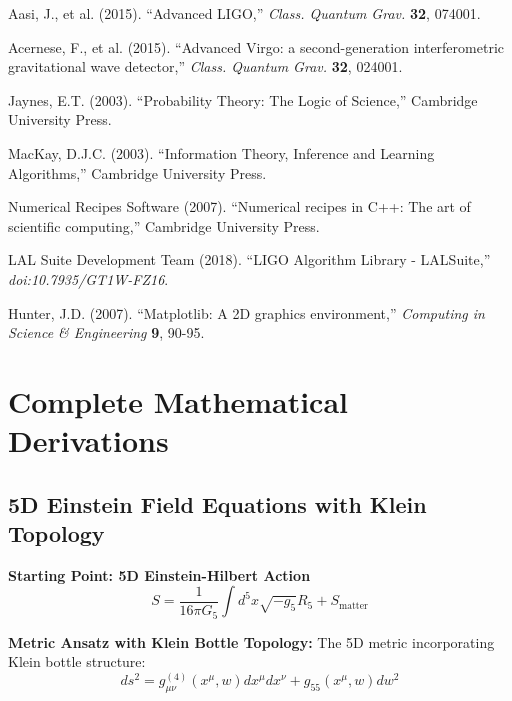 \documentclass[12pt,a4paper]{article}
\begin{document}
\begin{thebibliography}{200}
Aasi, J., et al. (2015). ``Advanced LIGO,'' \textit{Class. Quantum Grav.} \textbf{32}, 074001.

Acernese, F., et al. (2015). ``Advanced Virgo: a second-generation interferometric gravitational wave detector,'' \textit{Class. Quantum Grav.} \textbf{32}, 024001.

Jaynes, E.T. (2003). ``Probability Theory: The Logic of Science,'' Cambridge University Press.

MacKay, D.J.C. (2003). ``Information Theory, Inference and Learning Algorithms,'' Cambridge University Press.

Numerical Recipes Software (2007). ``Numerical recipes in C++: The art of scientific computing,'' Cambridge University Press.

LAL Suite Development Team (2018). ``LIGO Algorithm Library - LALSuite,'' \textit{doi:10.7935/GT1W-FZ16}.

Hunter, J.D. (2007). ``Matplotlib: A 2D graphics environment,'' \textit{Computing in Science \& Engineering} \textbf{9}, 90-95.

\end{thebibliography}

\appendix
\section{Complete Mathematical Derivations}

\subsection{5D Einstein Field Equations with Klein Topology}

\textbf{Starting Point: 5D Einstein-Hilbert Action}
\begin{equation}
S = \frac{1}{16\pi G_5} \int d^5x \sqrt{-g_5} R_5 + S_{\text{matter}}
\end{equation}

\textbf{Metric Ansatz with Klein Bottle Topology:}
The 5D metric incorporating Klein bottle structure:
\begin{equation}
ds^2 = g_{\mu\nu}^{(4)}(x^\mu, w) dx^\mu dx^\nu + g_{55}(x^\mu, w) dw^2
\end{equation}
\end{document}
